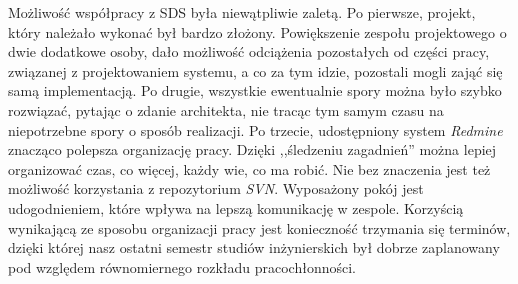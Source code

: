 Możliwość współpracy z SDS była niewątpliwie zaletą. Po pierwsze, projekt, który należało wykonać był bardzo złożony. Powiększenie zespołu projektowego o dwie dodatkowe osoby, dało możliwość odciążenia pozostałych od części pracy, związanej z projektowaniem systemu, a co za tym idzie, pozostali mogli zająć się samą implementacją. Po drugie, wszystkie ewentualnie spory można było szybko rozwiązać, pytając o zdanie architekta, nie tracąc tym samym czasu na niepotrzebne spory o sposób realizacji. Po trzecie, udostępniony system \textit{Redmine} znacząco polepsza organizację pracy. Dzięki ,,śledzeniu zagadnień'' można lepiej organizować czas, co więcej, każdy wie, co ma robić. Nie bez znaczenia jest też możliwość korzystania z repozytorium \textit{SVN}. Wyposażony pokój jest udogodnieniem, które wpływa na lepszą komunikację w zespole. Korzyścią wynikającą ze sposobu organizacji pracy jest konieczność trzymania się terminów, dzięki której nasz ostatni semestr studiów inżynierskich był dobrze zaplanowany pod względem równomiernego rozkładu pracochłonności.